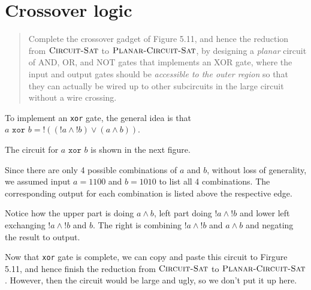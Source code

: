 \section*{Crossover logic}
    \begin{quote}
    Complete the crossover gadget of Figure 5.11, and hence the reduction from
    $\textsc{Circuit-Sat}$ to $\textsc{Planar-Circuit-Sat}$,
    by designing a \emph{planar} circuit of AND, OR, and NOT gates that implements an XOR gate, 
    where
    the input and output gates should be \emph{accessible to the outer region} so that they can actually be wired up to other subcircuits in the large circuit without a wire crossing.
    \end{quote}

    To implement an \texttt{xor} gate, the general idea is that $a \texttt{ xor } b = !((!a \wedge !b) \vee (a \wedge b))$.
    
    The circuit for $a \texttt{ xor } b$ is shown in the next figure. 

    Since there are only 4 possible combinations of $a$ and $b$, without loss of generality, we assumed input $a = 1100$ and $b = 1010$ to list all 4 combinations. 
    The corresponding output for each combination is listed above the respective edge.

    Notice how the upper part is doing $a \wedge b$, left part doing $!a \wedge !b$ and lower left exchanging $!a \wedge !b$ and $b$.
    The right is combining $!a \wedge !b$ and $a \wedge b$ and negating the result to output.

    Now that \texttt{xor} gate is complete, we can copy and paste this circuit to Firgure 5.11, and hence finish the reduction from
    $\textsc{Circuit-Sat}$ to $\textsc{Planar-Circuit-Sat}$.
    However, then the circuit would be large and ugly, so we don't put it up here.

